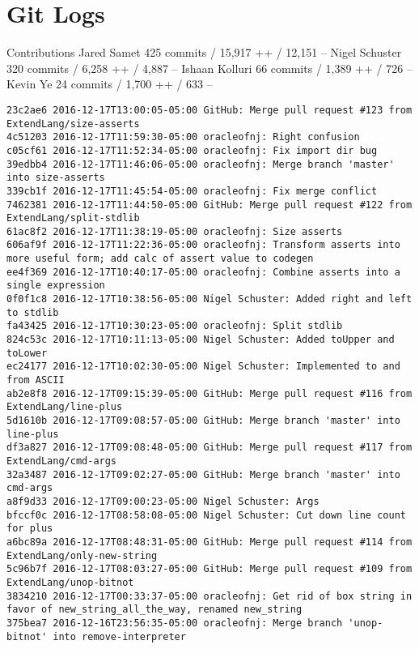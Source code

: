 \medskip \noindent
\chapter{Git Logs}
Contributions\newline
Jared Samet 425 commits / 15,917 ++ / 12,151 --\newline
Nigel Schuster 320 commits / 6,258 ++ / 4,887 --\newline
Ishaan Kolluri 66 commits / 1,389 ++ / 726 --\newline
Kevin Ye 24 commits / 1,700 ++ / 633 --\newline
\begin{lstlisting}
23c2ae6 2016-12-17T13:00:05-05:00 GitHub: Merge pull request #123 from ExtendLang/size-asserts
4c51203 2016-12-17T11:59:30-05:00 oracleofnj: Right confusion
c05cf61 2016-12-17T11:52:34-05:00 oracleofnj: Fix import dir bug
39edbb4 2016-12-17T11:46:06-05:00 oracleofnj: Merge branch 'master' into size-asserts
339cb1f 2016-12-17T11:45:54-05:00 oracleofnj: Fix merge conflict
7462381 2016-12-17T11:44:50-05:00 GitHub: Merge pull request #122 from ExtendLang/split-stdlib
61ac8f2 2016-12-17T11:38:19-05:00 oracleofnj: Size asserts
606af9f 2016-12-17T11:22:36-05:00 oracleofnj: Transform asserts into more useful form; add calc of assert value to codegen
ee4f369 2016-12-17T10:40:17-05:00 oracleofnj: Combine asserts into a single expression
0f0f1c8 2016-12-17T10:38:56-05:00 Nigel Schuster: Added right and left to stdlib
fa43425 2016-12-17T10:30:23-05:00 oracleofnj: Split stdlib
824c53c 2016-12-17T10:11:13-05:00 Nigel Schuster: Added toUpper and toLower
ec24177 2016-12-17T10:02:30-05:00 Nigel Schuster: Implemented to and from ASCII
ab2e8f8 2016-12-17T09:15:39-05:00 GitHub: Merge pull request #116 from ExtendLang/line-plus
5d1610b 2016-12-17T09:08:57-05:00 GitHub: Merge branch 'master' into line-plus
df3a827 2016-12-17T09:08:48-05:00 GitHub: Merge pull request #117 from ExtendLang/cmd-args
32a3487 2016-12-17T09:02:27-05:00 GitHub: Merge branch 'master' into cmd-args
a8f9d33 2016-12-17T09:00:23-05:00 Nigel Schuster: Args
bfccf0c 2016-12-17T08:58:08-05:00 Nigel Schuster: Cut down line count for plus
a6bc89a 2016-12-17T08:48:31-05:00 GitHub: Merge pull request #114 from ExtendLang/only-new-string
5c96b7f 2016-12-17T08:03:27-05:00 GitHub: Merge pull request #109 from ExtendLang/unop-bitnot
3834210 2016-12-17T00:33:37-05:00 oracleofnj: Get rid of box string in favor of new_string_all_the_way, renamed new_string
375bea7 2016-12-16T23:56:35-05:00 oracleofnj: Merge branch 'unop-bitnot' into remove-interpreter

\end{lstlisting}
